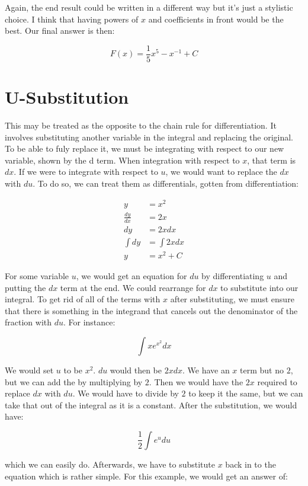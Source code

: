 \documentclass[12pt]{article}
\begin{document}
Again, the end result could be written in a different way but it's just a stylistic choice. I think that having powers of $x$ and coefficients in front would be the best. Our final answer is then:

$$
    F(x) = \frac{1}{5} x^{5} -{x^{-1}} + C
$$

\section{U-Substitution}

This may be treated as the opposite to the chain rule for differentiation.
It involves substituting another variable in the integral and replacing the original.
To be able to fuly replace it, we must be integrating with respect to our new variable, shown by the d term.
When integration with respect to $x$, that term is $dx$. If we were to integrate with respect to $u$, we would want to replace the $dx$ with $du$.
To do so, we can treat them as differentials, gotten from differentiation:


\begin{align}
    y             & = x^2        \\
    \frac{dy}{dx} & = 2x         \\
    dy            & = 2x dx      \\
    \int dy       & = \int 2x dx \\
    y             & = x^2 + C
\end{align}


For some variable $u$, we would get an equation for $du$ by differentiating $u$ and putting the $dx$ term at the end.
We could rearrange for $dx$ to substitute into our integral.
To get rid of all of the terms with $x$ after substituting, we must ensure that there is something in the integrand that cancels out the denominator of the fraction with $du$.
For instance:

$$
    \int xe^{x^2} dx
$$

We would set $u$ to be $x^2$.
$du$ would then be $2x dx$.
We have an $x$ term but no $2$, but we can add the by multiplying by $2$.
Then we would have the $2x$ required to replace $dx$ with $du$.
We would have to divide by $2$ to keep it the same, but we can take that out of the integral as it is a constant.
After the substitution, we would have:

$$
    \frac{1}{2} \int e^u du
$$

which we can easily do.
Afterwards, we have to substitute $x$ back in to the equation which is rather simple.
For this example, we would get an answer of:
\end{document}
